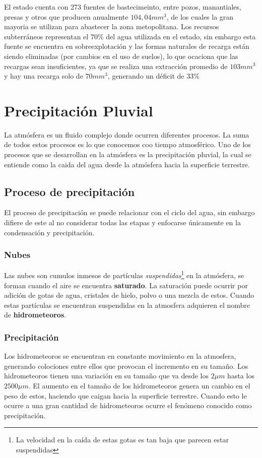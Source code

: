 \documentclass[letterpaper,12pt,oneside]{book}
\begin{document}
            El estado cuenta con 273 fuentes de bastecimeinto, entre pozos, manantiales, presas y otros que producen anualmente $104,04 mm^3$, de los cuales la gran mayoria se utilizan para abastecer la zona metopolitana. 
            Los recursos subterráneos representan el $70\%$ del agua utilizada en el estado, sin embargo esta fuente se encuentra en sobreexplotación y las formas naturales de recarga están siendo eliminadas (por cambios en el uso de suelos), lo que ocaciona que las recargas sean insuficientes, ya que se realiza una extracción promedio de $103 mm^3$ y hay una recarga solo de $70 mm^3$, generando un déficit de $33\%$

\chapter{Precipitación Pluvial} 
    La atmósfera es un fluido complejo donde ocurren diferentes procesos. La suma de todos estos procesos es lo que conocemos coo tiempo atmosférico. Uno de los procesos que se desarrollan en la atmósfera es la precipitación pluvial, la cual se entiende como la caida del agua desde la atmósfera hacia la superficie terrestre.

    \section{Proceso de precipitación}
        El proceso de precipitación se puede relacionar con el ciclo del agua, sin embargo difiere de este al no considerar todas las etapas y enfocarse únicamente en la condensación y precipitación.
        \subsection{Nubes}
            Las nubes son cumulos inmesos de partículas \textit{suspendidas}\footnote{La velocidad en la caída de estas gotas es tan baja que parecen estar suspendidas} en la atmósfera, se forman cuando el aire se encuentra \textbf{saturado}. La saturación puede ocurrir por adición de gotas de agua, cristales de hielo, polvo o una mezcla de estos. 
            Cuando estas partículas se encuentran suspendidas en la atmosfera adquieren el nombre de \textbf{hidrometeoros}.
        \subsection{Precipitación}
            Los hidrometeoros se encuentran en constante movimiento en la atmosfera, generando colociones entre ellos que provocan el incremento en su tamaño. Los hidrometeoros tienen una variación en su tamaño que va desde los $2\mu m$ hasta los $2500 \mu m$. El aumento en el tamaño de los hidrometeoros genera un cambio en el peso de estos, haciendo que caigan hacia la superficie terrestre. Cuando esto le ocurre a una gran cantidad de hidrometeoros ocurre el fenómeno conocido como precipitación.
\end{document}
